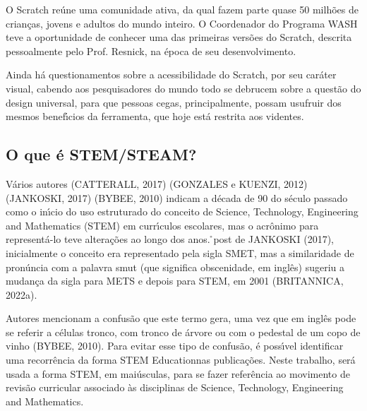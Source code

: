\documentclass[
12pt,		%
openright,	%
twoside,  %
a4paper,			%
chapter=TITLE,		%
english,			%
french,				%
spanish,			%
brazil				%
]{USPSC-classe/USPSC}
\begin{document}
O Scratch re\'une uma comunidade ativa, da qual fazem parte quase 50 milh\~oes de crian\c{c}as, jovens e adultos do mundo inteiro. O Coordenador do Programa WASH teve a oportunidade de conhecer uma das primeiras vers\~oes do Scratch, descrita pessoalmente pelo Prof. Resnick, na \'epoca de seu desenvolvimento.








Ainda h\'a questionamentos sobre a acessibilidade do Scratch, por seu car\'ater visual, cabendo aos pesquisadores do mundo todo se debrucem sobre a quest\~ao do design universal, para que pessoas cegas, principalmente, possam usufruir dos mesmos benef\'{\i}cios da ferramenta, que hoje est\'a restrita aos videntes.








\subsection[O que \'e STEM/STEAM?]{O que \'e STEM/STEAM?}\label{O que \'e STEM/STEAM?}
V\'arios autores (CATTERALL, 2017)  (GONZALES e KUENZI, 2012)  (JANKOSKI, 2017)  (BYBEE, 2010) indicam a d\'ecada de 90 do s\'eculo passado como o in\'{\i}cio do uso estruturado do conceito de Science, Technology, Engineering and Mathematics (STEM) em curr\'{\i}culos escolares, mas o acr\^onimo para represent\'a-lo teve altera\c{c}\~oes ao longo dos anos. \r\nSegundo post de  JANKOSKI (2017), inicialmente o conceito era representado pela sigla SMET, mas a similaridade de pron\'uncia com a palavra \textquotedbl smut (que significa obscenidade, em ingl\^es) sugeriu a mudan\c{c}a da sigla para METS e depois para STEM, em 2001  (BRITANNICA, 2022a).








Autores mencionam a confus\~ao que este termo gera, uma vez que em ingl\^es pode se referir a c\'elulas tronco, com tronco de \'arvore ou com o pedestal de um copo de vinho  (BYBEE, 2010). Para evitar esse tipo de confus\~ao, \'e poss\'{\i}vel identificar uma recorr\^encia da forma \textquotedbl STEM Education\textquotedbl  nas publica\c{c}\~oes. Neste trabalho, ser\'a usada a forma STEM, em mai\'usculas, para se fazer refer\^encia ao movimento de revis\~ao curricular associado \`as disciplinas de \textquotedbl Science, Technology, Engineering and Mathematics.
\end{document}
